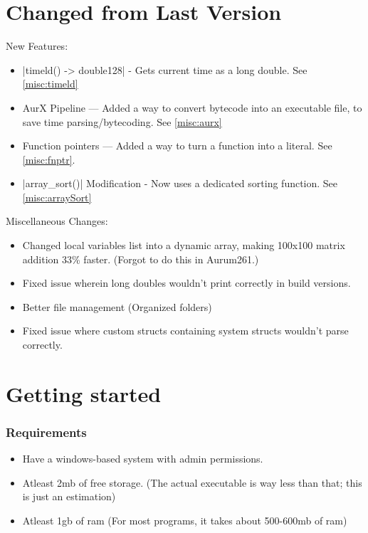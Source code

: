 \documentclass[12pt, letterpaper, oneside]{article}
\begin{document}
	\section{Changed from Last Version}
		New Features:
		\begin{itemize}
			\item[--] \spverb|timeld() -> double128| - Gets current time as a long double. See \ref{misc:timeld}
			\item[--] AurX Pipeline --- Added a way to convert bytecode into an executable file, to save time parsing/bytecoding. See \ref{misc:aurx}
			\item[--] Function pointers --- Added a way to turn a function into a literal. See \ref{misc:fnptr}.
			\item[--] \spverb|array_sort()| Modification - Now uses a dedicated sorting function. See \ref{misc:arraySort}
		\end{itemize}
		Miscellaneous Changes:
		\begin{itemize}
			\item[--] Changed local variables list into a dynamic array, making 100x100 matrix addition 33\% faster. (Forgot to do this in Aurum261.)
			\item[--] Fixed issue wherein long doubles wouldn't print correctly in build versions.
			\item[--] Better file management (Organized folders)
			\item[--] Fixed issue where custom structs containing system structs wouldn't parse correctly.
			
		\end{itemize}
	\newpage
	\section{Getting started}
		\subsubsection{Requirements}
			\begin{itemize}
				\item[--] Have a windows-based system with admin permissions.
				\item[--] Atleast 2mb of free storage. (The actual executable is way less than that; this is just an estimation)
				\item[--] Atleast 1gb of ram (For most programs, it takes about 500-600mb of ram)
			\end{itemize}
\end{document}
